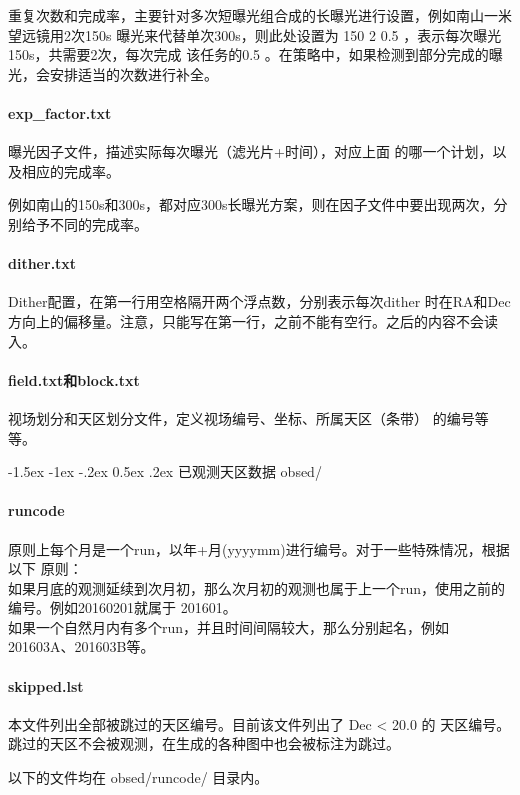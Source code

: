 \documentclass[a4paper,12pt]{article}
\makeatletter
\renewcommand\subsection{\@startsection{subsection}{1}{\z@}%
{-1.5ex \@plus -1ex \@minus -.2ex}%
{0.5ex \@plus.2ex}%
{\normalfont\normalsize\CJKfamily{hei}}}
\makeatother
\begin{document}
重复次数和完成率，主要针对多次短曝光组合成的长曝光进行设置，例如南山一米望远镜用2次150s
曝光来代替单次300s，则此处设置为 150  2  0.5 ，表示每次曝光150s，共需要2次，每次完成
该任务的0.5 。在策略中，如果检测到部分完成的曝光，会安排适当的次数进行补全。

\paragraph{exp\_factor.txt} 曝光因子文件，描述实际每次曝光（滤光片+时间），对应上面
的哪一个计划，以及相应的完成率。

例如南山的150s和300s，都对应300s长曝光方案，则在因子文件中要出现两次，分别给予不同的完成率。

\paragraph{dither.txt} Dither配置，在第一行用空格隔开两个浮点数，分别表示每次dither
时在RA和Dec方向上的偏移量。注意，只能写在第一行，之前不能有空行。之后的内容不会读入。

\paragraph{field.txt和block.txt} 视场划分和天区划分文件，定义视场编号、坐标、所属天区（条带）
的编号等等。

\subsection{已观测天区数据 obsed/}

\paragraph{runcode} 原则上每个月是一个run，以年+月(yyyymm)进行编号。对于一些特殊情况，根据以下
原则：\\
如果月底的观测延续到次月初，那么次月初的观测也属于上一个run，使用之前的编号。例如20160201就属于
201601。\\
如果一个自然月内有多个run，并且时间间隔较大，那么分别起名，例如201603A、201603B等。

\paragraph{skipped.lst} 本文件列出全部被跳过的天区编号。目前该文件列出了 Dec < 20.0 的
天区编号。跳过的天区不会被观测，在生成的各种图中也会被标注为跳过。

以下的文件均在 obsed/runcode/ 目录内。
\end{document}
